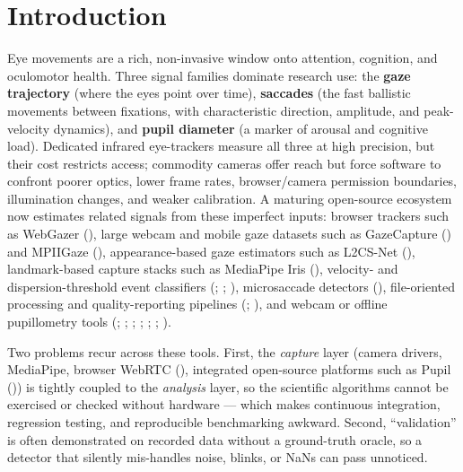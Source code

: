 \documentclass[
]{article}
\begin{document}
\section{Introduction}\label{sec:introduction}

Eye movements are a rich, non-invasive window onto attention, cognition,
and oculomotor health. Three signal families dominate research use: the
\textbf{gaze trajectory} (where the eyes point over time),
\textbf{saccades} (the fast ballistic movements between fixations, with
characteristic direction, amplitude, and peak-velocity dynamics), and
\textbf{pupil diameter} (a marker of arousal and cognitive load).
Dedicated infrared eye-trackers measure all three at high precision, but
their cost restricts access; commodity cameras offer reach but force
software to confront poorer optics, lower frame rates, browser/camera
permission boundaries, illumination changes, and weaker calibration. A
maturing open-source ecosystem now estimates related signals from these
imperfect inputs: browser trackers such as WebGazer
(), large
webcam and mobile gaze datasets such as GazeCapture
() and MPIIGaze
(),
appearance-based gaze estimators such as L2CS-Net
(), landmark-based
capture stacks such as MediaPipe Iris
(),
velocity- and dispersion-threshold event classifiers
(;
;
),
microsaccade detectors (), file-oriented processing and quality-reporting
pipelines (;
),
and webcam or offline pupillometry tools
(;
;
;
;
;
;
).

Two problems recur across these tools. First, the \emph{capture} layer
(camera drivers, MediaPipe, browser WebRTC
(),
integrated open-source platforms such as Pupil
()) is
tightly coupled to the \emph{analysis} layer, so the scientific
algorithms cannot be exercised or checked without hardware --- which
makes continuous integration, regression testing, and reproducible
benchmarking awkward. Second, ``validation'' is often demonstrated on
recorded data without a ground-truth oracle, so a detector that silently
mis-handles noise, blinks, or NaNs can pass unnoticed.
\end{document}
